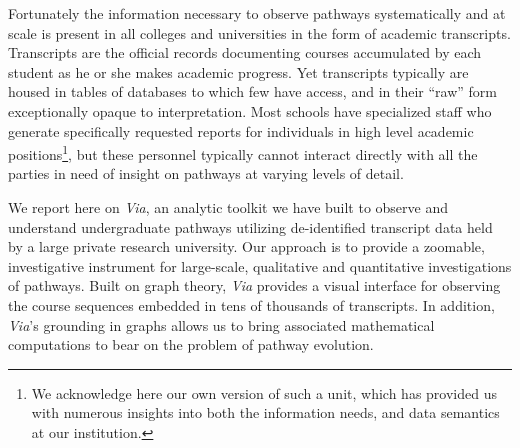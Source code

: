 


Fortunately the information necessary to observe pathways systematically and at scale is present in all colleges and universities in the form of academic transcripts. Transcripts are the official records documenting courses accumulated by each student as he or she makes academic progress. Yet transcripts typically are housed in tables of databases to which few have access, and in their ``raw'' form exceptionally opaque to interpretation. Most schools have specialized staff who generate specifically requested reports for individuals in high level academic positions\footnote{We acknowledge
here our own version of such a unit, which has provided us with numerous insights into both the information needs, and data semantics at our institution.}, but these personnel typically cannot interact directly with all the parties in need of insight on pathways at varying levels of detail.


We report here on {\it Via}, an analytic toolkit we have built to observe and understand undergraduate pathways utilizing de-identified transcript data held by a large private research university. Our approach is to provide a zoomable, investigative
instrument for large-scale, qualitative and quantitative
investigations of pathways. Built on graph theory, {\it Via} provides a
visual interface for observing the course sequences embedded in tens
of thousands of transcripts. In addition, {\it Via}'s grounding in graphs
allows us to bring associated mathematical computations to bear on the problem of pathway evolution.

